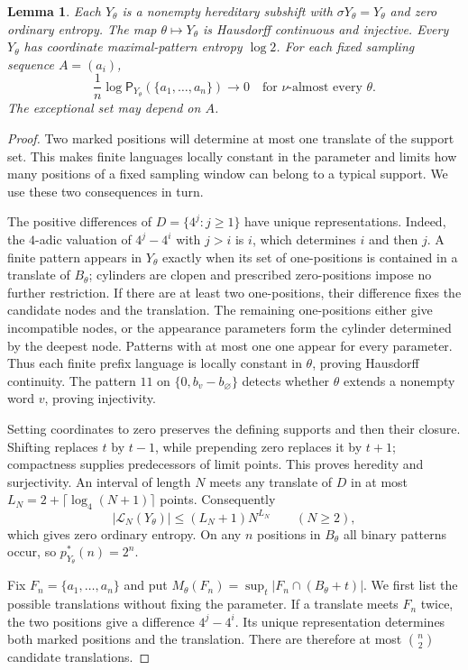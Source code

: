\documentclass[11pt,reqno]{amsart}
\numberwithin{equation}{section}
\newtheorem{lemma}[theorem]{Lemma}
\theoremstyle{definition}
\theoremstyle{definition}
\newcommand{\Patt}{\mathsf P}
\begin{document}
\begin{lemma}\label{lem:sparse-bundle}
Each $Y_\theta$ is a nonempty hereditary subshift with
$\sigma Y_\theta=Y_\theta$ and zero ordinary entropy.
The map $\theta\mapsto Y_\theta$ is Hausdorff continuous and injective.
Every $Y_\theta$ has coordinate maximal-pattern entropy $\log2$.
For each fixed sampling sequence $A=(a_i)$,
\[
 \frac1n\log\Patt_{Y_\theta}(\{a_1,\ldots,a_n\})
 \longrightarrow0
 \quad\text{for }\nu\text{-almost every }\theta.
\]
The exceptional set may depend on $A$.
\end{lemma}
\begin{proof}
Two marked positions will determine at most one translate of the
support set. This makes finite languages locally constant in the
parameter and limits how many positions of a fixed sampling window
can belong to a typical support. We use these two consequences in
turn.

The positive differences of $D=\{4^j:j\ge1\}$ have unique
representations. Indeed, the $4$-adic valuation of
$4^j-4^i$ with $j>i$ is $i$, which determines $i$ and then $j$.
A finite pattern appears in $Y_\theta$ exactly when its set of
one-positions is contained in a translate of $B_\theta$;
cylinders are clopen and prescribed zero-positions impose no
further restriction. If there are at least two one-positions,
their difference fixes the candidate nodes and the translation.
The remaining one-positions either give incompatible nodes, or
the appearance parameters form the cylinder determined by the
deepest node. Patterns with at most one one appear for every
parameter. Thus each finite prefix language is locally constant
in $\theta$, proving Hausdorff continuity. The pattern $11$ on
$\{0,b_v-b_\varnothing\}$ detects whether $\theta$ extends a
nonempty word $v$, proving injectivity.

Setting coordinates to zero preserves the defining supports and
then their closure. Shifting replaces $t$ by $t-1$, while
prepending zero replaces it by $t+1$; compactness supplies
predecessors of limit points. This proves heredity and surjectivity.
An interval of length $N$ meets any translate of $D$ in at most
$L_N=2+\lceil\log_4(N+1)\rceil$ points. Consequently
\[
 |\mathcal L_N(Y_\theta)|
 \le (L_N+1)N^{L_N}\qquad(N\ge2),
\]
which gives zero ordinary entropy. On any $n$ positions in
$B_\theta$ all binary patterns occur, so $p_{Y_\theta}^*(n)=2^n$.

Fix $F_n=\{a_1,\ldots,a_n\}$ and put
$M_\theta(F_n)=\sup_t|F_n\cap(B_\theta+t)|$.
We first list the possible translations without fixing the
parameter. If a translate meets $F_n$ twice, the two positions
give a difference $4^j-4^i$. Its unique representation determines
both marked positions and the translation. There are therefore at
most $\binom n2$ candidate translations.


\end{proof}
\end{document}
